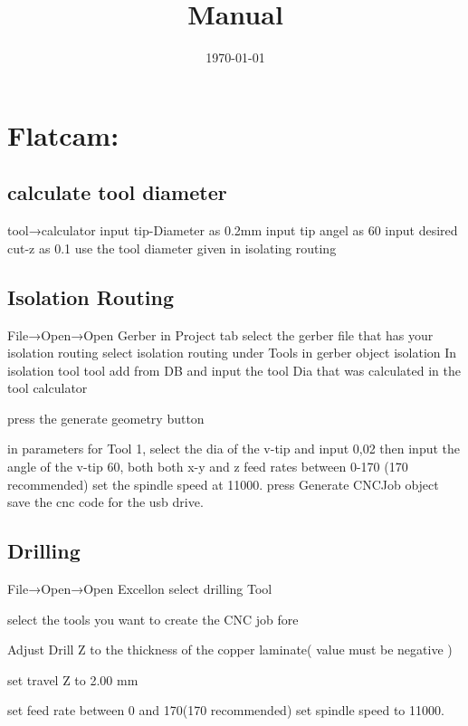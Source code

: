 \documentclass[12pt]{article}
\title{Manual}
\author{}
\date{\today}
\begin{document}
\maketitle{}

\tableofcontents

\clearpage
\newpage

\section{Flatcam:}


\subsection{calculate tool diameter}
tool→calculator
input tip-Diameter as 0.2mm
input tip angel as 60
input desired cut-z as 0.1 
use the tool diameter given in isolating routing

\subsection{Isolation Routing}
File→Open→Open Gerber
 in Project tab select the gerber file that has your isolation routing 
 select isolation routing under Tools in gerber object isolation 
 In isolation tool tool add from DB and input the tool Dia that was calculated in the tool calculator 

press the generate geometry button

in parameters for Tool 1, select the dia of the v-tip and input 0,02 then input the angle of the v-tip 60, both both x-y and z feed rates between 0-170 (170 recommended) 
set the spindle speed at 11000. 
press Generate CNCJob object 
save the cnc code for the usb drive.

\subsection{Drilling}
File→Open→Open Excellon
select drilling Tool

select the tools you want to create the CNC job fore 

Adjust Drill Z to the thickness of the copper laminate( value must be negative )

set travel Z to 2.00 mm 

set feed rate between 0 and 170(170 recommended) 
set spindle speed to 11000.
\end{document}
